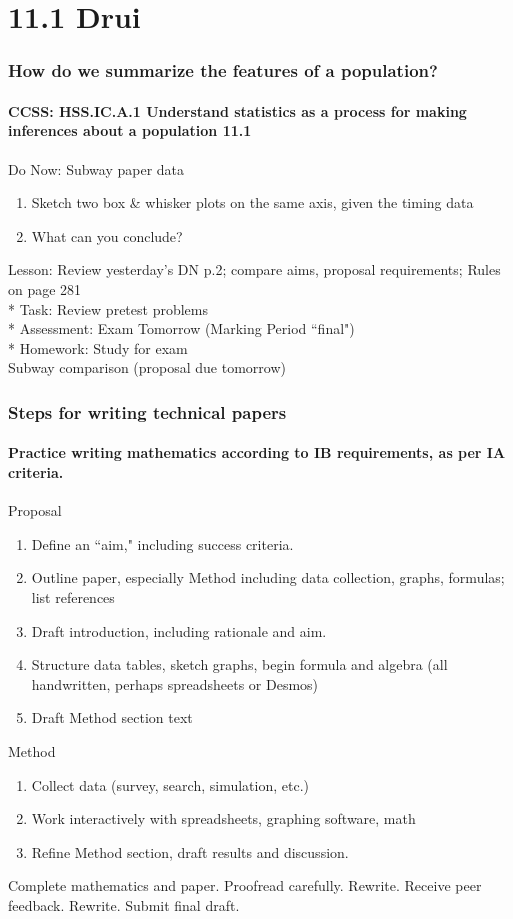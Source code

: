 \documentclass{beamer}
\begin{document}
\section{11.1 Drui}
\frame
{
  \frametitle{How do we summarize the features of a population?}
  \framesubtitle{CCSS: HSS.IC.A.1 Understand statistics as a process for making inferences about a population \qquad \alert{11.1}}

  \begin{block}{Do Now: Subway paper data}
  \begin{enumerate}
      \item Sketch two box \& whisker plots on the same axis, given the timing data 
      \item What can you conclude?
  \end{enumerate}
  \end{block}
  Lesson: Review yesterday's DN p.2; compare aims, proposal requirements; Rules on page 281\\*
  Task: Review pretest problems\\*
  Assessment: Exam Tomorrow (Marking Period ``final")\\*
  Homework: Study for exam\\ 
  Subway comparison (proposal due tomorrow)\\
}

\frame
{
  \frametitle{Steps for writing technical papers}
  \framesubtitle{Practice writing mathematics according to IB requirements, as per IA criteria.}
Proposal
\begin{enumerate}
    \item Define an ``aim," including success criteria. 
    \item Outline paper, especially Method including data collection, graphs, formulas; list references
    \item Draft introduction, including rationale and aim.
    \item Structure data tables, sketch graphs, begin formula and algebra (all handwritten, perhaps spreadsheets or Desmos)
    \item Draft Method section text
\end{enumerate}
Method
\begin{enumerate}
    \item Collect data (survey, search, simulation, etc.)
    \item Work interactively with spreadsheets, graphing software, math
    \item Refine Method section, draft results and discussion.
\end{enumerate}
Complete mathematics and paper. Proofread carefully. Rewrite. Receive peer feedback. Rewrite. Submit final draft.
}
\end{document}

